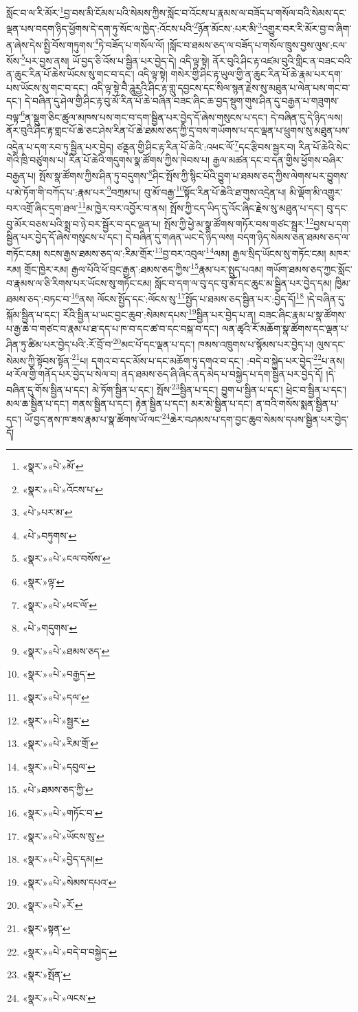 སློང་བ་ལ་རི་མོར་\footnote{«སྣར་»«པེ་»མོ་}བྱ་བས་མི་ངོམས་པའི་སེམས་ཀྱིས་སློང་བ་འོངས་པ་རྣམས་ལ་བཟོད་པ་གསོལ་བའི་སེམས་དང་ལྡན་པས་བདག་ཉིད་ཕྱོགས་དེ་དག་ཏུ་སོང་ལ་ཁྱེད་:འོངས་པའི་\footnote{«སྣར་»«པེ་»འོངས་པ་}ཉོན་མོངས་:པར་མི་\footnote{«པེ་»པར་མ་}འགྱུར་བར་རི་མོར་བྱ་བ་ཞིག་ན་ཞེས་དེས་སྤྱི་བོས་གཏུགས་\footnote{«པེ་»བཏུགས་}ཏེ་བཟོད་པ་གསོལ་ལོ། །སློང་བ་ཐམས་ཅད་ལ་བཟོད་པ་གསོལ་ཁྲུས་བྱས་ལུས་:ངལ་སོས་\footnote{«སྣར་»«པེ་»ངལ་བསོས་}པར་བྱས་ནས། ཡོ་བྱད་ཅི་འོས་པ་སྦྱིན་པར་བྱེད་དེ། འདི་ལྟ་སྟེ། ནོར་བུའི་ཤིང་རྟ་འཛམ་བུའི་གླིང་ན་བཟང་བའི་ན་ཆུང་རིན་པོ་ཆེས་ཡོངས་སུ་གང་བ་དང་། འདི་ལྟ་སྟེ། གསེར་གྱི་ཤིང་རྟ་ཡུལ་གྱི་ན་ཆུང་རིན་པོ་ཆེ་རྣམ་པར་དག་པས་ཡོངས་སུ་གང་བ་དང་། འདི་ལྟ་སྟེ་བཻ་ཌཱུརྱའི་ཤིང་རྟ་གླུ་དབྱངས་དང་སིལ་སྙན་རྗེས་སུ་མཐུན་པ་ལེན་པས་གང་བ་དང་། དེ་བཞིན་དུ་ཤེལ་གྱི་ཤིང་རྟ་བུ་མོ་རིན་པོ་ཆེ་བཞིན་བཟང་ཞིང་ཆ་བྱད་སྡུག་གུས་ཤིན་དུ་བརྒྱན་པ་གཟུགས་བལྟ་\footnote{«སྣར་»ལྟ་}ན་སྡུག་ཅིང་ཚུལ་མཁས་པས་གང་བ་དག་སྦྱིན་པར་བྱེད་དོ་ཞེས་གསུངས་པ་དང་། དེ་བཞིན་དུ་དེ་ཉིད་ལས། ནོར་བུའི་ཤིང་རྟ་གླང་པོ་ཆེ་ཅང་ཤེས་རིན་པོ་ཆེ་ཐམས་ཅད་ཀྱི་དྲ་བས་གཡོགས་པ་དང་ལྡན་པ་ཕྲུགས་སུ་མཐུན་པས་འདྲེན་པ་དག་རབ་ཏུ་སྦྱིན་པར་བྱེད། ཙནྡན་གྱི་ཤིང་རྟ་རིན་པོ་ཆེའི་:འཕང་ལོ་\footnote{«སྣར་»«པེ་»ཕང་ལོ་}དང་རྩིབས་སྦྱར་བ། རིན་པོ་ཆེའི་སེང་གེའི་ཁྲི་བཙུགས་པ། རིན་པོ་ཆེའི་གདུགས་སྣ་ཚོགས་ཀྱིས་ཁེབས་པ། རྒྱལ་མཚན་དང་བ་དན་གྱིས་ཕྱོགས་བཞིར་བརྒྱན་པ། སྤོས་སྣ་ཚོགས་ཀྱིས་ཤིན་ཏུ་བདུགས་\footnote{«པེ་»གདུགས་}ཤིང་སྤོས་ཀྱི་སྙིང་པོའི་བྱུག་པ་ཐམས་ཅད་ཀྱིས་ལེགས་པར་བྱུགས་པ་མེ་ཏོག་གི་བཀོད་པ་:རྣམ་པར་\footnote{«སྣར་»«པེ་»ཐམས་ཅད་}བཀྲམ་པ། བུ་མོ་བརྒྱ་\footnote{«སྣར་»«པེ་»བརྒྱད་}སྟོང་རིན་པོ་ཆེའི་ཐ་གུས་འདྲེན་པ། མི་ལྡོག་མི་འགྱུར་བར་འགྲོ་ཞིང་དྲག་ཐལ་\footnote{«སྣར་»«པེ་»དལ་}མ་ཁྱེར་བར་འབྱོར་བ་ནས། སྤོས་ཀྱི་ངད་ཡིད་དུ་འོང་ཞིང་རྗེས་སུ་མཐུན་པ་དང་། བུ་དང་བུ་མོར་བཅས་པའི་སྨྲ་བ་ཉེ་བར་སྦྱོར་བ་དང་ལྡན་པ། སྤོས་ཀྱི་ཕྱེ་མ་སྣ་ཚོགས་གཏོར་བས་གཙང་སྦྲར་\footnote{«སྣར་»«པེ་»སྦྱར་}བྱས་པ་དག་སྦྱིན་པར་བྱེད་དོ་ཞེས་གསུངས་པ་དང་། དེ་བཞིན་དུ་གཞན་ཡང་དེ་ཉིད་ལས། བདག་ཉིད་སེམས་ཅན་ཐམས་ཅད་ལ་གཏོང་ངམ། སངས་རྒྱས་ཐམས་ཅད་ལ་:རིམ་གྲོར་\footnote{«སྣར་»«པེ་»རིམ་གྲོ་}བྱ་བར་འབུལ་\footnote{«སྣར་»«པེ་»དབུལ་}ལམ། རྒྱལ་སྲིད་ཡོངས་སུ་གཏོང་ངམ། མཁར་རམ། གྲོང་ཁྱེར་རམ། རྒྱལ་པོའི་ཕོ་བྲང་རྒྱན་:ཐམས་ཅད་ཀྱིས་\footnote{«པེ་»ཐམས་ཅད་ཀྱི་}རྣམ་པར་སྤུད་པའམ། གཡོག་ཐམས་ཅད་ཀྱང་སློང་བ་རྣམས་ལ་ཅི་རིགས་པར་ཡོངས་སུ་གཏོང་ངམ། སློང་བ་དག་ལ་བུ་དང་བུ་མོ་དང་ཆུང་མ་སྦྱིན་པར་བྱེད་དམ། ཁྱིམ་ཐམས་ཅད་:བཏང་བ་\footnote{«སྣར་»«པེ་»གཏོང་བ་}ནས། ལོངས་སྤྱོད་དང་:ལོངས་སུ་\footnote{«སྣར་»«པེ་»ཡོངས་སུ་}སྤྱོད་པ་ཐམས་ཅད་སྦྱིན་པར་:བྱེད་དོ།\footnote{«སྣར་»«པེ་»བྱེད་དམ།} །དེ་བཞིན་དུ་སྐོམ་སྦྱིན་པ་དང་། རོའི་སྦྱིན་པ་ཡང་བྱང་ཆུབ་:སེམས་དཔས་\footnote{«སྣར་»«པེ་»སེམས་དཔའ་}སྦྱིན་པར་བྱེད་པ་ན། བཟང་ཞིང་རྣམ་པ་སྣ་ཚོགས་པ་རྒྱ་ཆེ་བ་གཙང་བ་རྣམ་པ་ཐ་དད་པ་ཁ་བ་དང་ཚ་བ་དང་བསྐ་བ་དང་། ལན་ཚྭའི་རོ་མཆོག་སྣ་ཚོགས་དང་ལྡན་པ་ཤིན་ཏུ་ཚིམ་པར་བྱེད་པའི་:རོ་བྲོ་བ་\footnote{«སྣར་»«པེ་»རོ་}མང་པོ་དང་ལྡན་པ་དང་། ཁམས་འཁྲུགས་པ་སྙོམས་པར་བྱེད་པ། ལུས་དང་སེམས་ཀྱི་སྟོབས་སྟོན་\footnote{«སྣར་»སྟན་}པ། དགའ་བ་དང་མོས་པ་དང་མཆོག་ཏུ་དགའ་བ་དང་། :བདེ་བ་སྐྱེད་པར་བྱེད་\footnote{«སྣར་»«པེ་»བདེ་བ་བསྐྱེད་}པ་ནས། ཕ་རོལ་གྱི་གནོད་པར་བྱེད་པ་སེལ་བ། ནད་ཐམས་ཅད་ཞི་ཞིང་ནད་མེད་པ་བསྐྱེད་པ་དག་སྦྱིན་པར་བྱེད་དོ། །དེ་བཞིན་དུ་གོས་སྦྱིན་པ་དང་། མེ་ཏོག་སྦྱིན་པ་དང་། སྤོས་\footnote{«སྣར་»སྤོན་}སྦྱིན་པ་དང་། བྱུག་པ་སྦྱིན་པ་དང་། ཕྲེང་བ་སྦྱིན་པ་དང་། མལ་ཆ་སྦྱིན་པ་དང་། གནས་སྦྱིན་པ་དང་། རྟེན་སྦྱིན་པ་དང་། མར་མེ་སྦྱིན་པ་དང་། ན་བའི་གསོས་སྨན་སྦྱིན་པ་དང་། ཡོ་བྱད་ནས་ཁ་ཟས་རྣམ་པ་སྣ་ཚོགས་ཡོ་ལང་\footnote{«སྣར་»«པེ་»ལངས་}ཆེར་བཤམས་པ་དག་བྱང་ཆུབ་སེམས་དཔས་སྦྱིན་པར་བྱེད་དོ། 